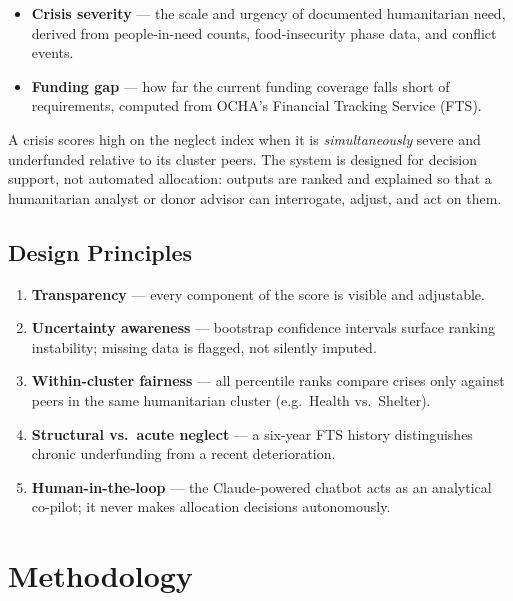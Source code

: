 \documentclass[11pt,a4paper]{article}
\begin{document}
\begin{itemize}[nosep]
  \item \textbf{Crisis severity} --- the scale and urgency of documented humanitarian need,
        derived from people-in-need counts, food-insecurity phase data, and conflict events.
  \item \textbf{Funding gap} --- how far the current funding coverage falls short of
        requirements, computed from OCHA's Financial Tracking Service (FTS).
\end{itemize}

A crisis scores high on the neglect index when it is \emph{simultaneously} severe and
underfunded relative to its cluster peers.
The system is designed for decision support, not automated allocation: outputs are
ranked and explained so that a humanitarian analyst or donor advisor can interrogate,
adjust, and act on them.

\subsection{Design Principles}

\begin{enumerate}[nosep]
  \item \textbf{Transparency} --- every component of the score is visible and adjustable.
  \item \textbf{Uncertainty awareness} --- bootstrap confidence intervals surface ranking
        instability; missing data is flagged, not silently imputed.
  \item \textbf{Within-cluster fairness} --- all percentile ranks compare crises only
        against peers in the same humanitarian cluster (e.g.\ Health vs.\ Shelter).
  \item \textbf{Structural vs.\ acute neglect} --- a six-year FTS history distinguishes
        chronic underfunding from a recent deterioration.
  \item \textbf{Human-in-the-loop} --- the Claude-powered chatbot acts as an analytical
        co-pilot; it never makes allocation decisions autonomously.
\end{enumerate}

\section{Methodology}
\end{document}
